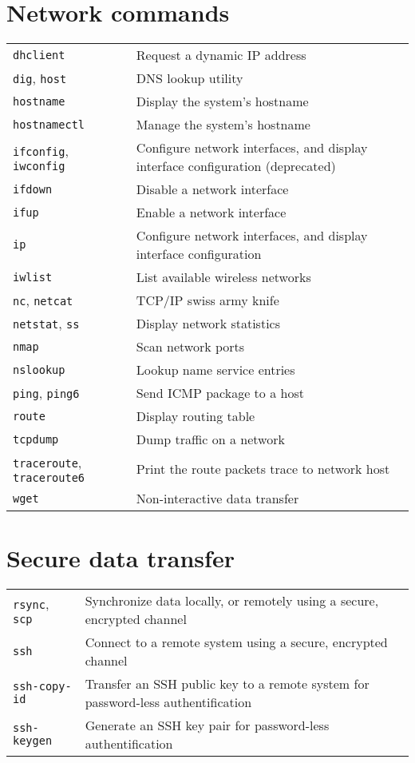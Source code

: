 \documentclass[10pt]{article}
\begin{document}
\begin{multicols}{2}

\section{Network commands}
\begin{tabular}{ p{2.5cm} p{8.5cm} }
  \hline
  \texttt{dhclient} & Request a dynamic IP address \\
  \texttt{dig}, \texttt{host} & DNS lookup utility \\
  \texttt{hostname} & Display the system's hostname \\
  \texttt{hostnamectl} & Manage the system's hostname \\
  \texttt{ifconfig}, \texttt{iwconfig} & Configure network interfaces, and display interface configuration (deprecated)\\
  \texttt{ifdown} & Disable a network interface \\
  \texttt{ifup} & Enable a network interface \\
  \texttt{ip} & Configure network interfaces, and display interface configuration \\
  \texttt{iwlist} & List available wireless networks \\
  \texttt{nc}, \texttt{netcat} & TCP/IP swiss army knife \\
  \texttt{netstat}, \texttt{ss} & Display network statistics \\
  \texttt{nmap} & Scan network ports \\
  \texttt{nslookup} & Lookup name service entries \\
  \texttt{ping}, \texttt{ping6} & Send ICMP package to a host \\
  \texttt{route} & Display routing table \\
  \texttt{tcpdump} & Dump traffic on a network \\
  \texttt{traceroute}, \texttt{traceroute6} & Print the route packets trace to network host\\
  \texttt{wget} & Non-interactive data transfer\\
  \hline
\end{tabular}

\section{Secure data transfer}
\begin{tabular}{ p{2.5cm} p{8.5cm} }
  \hline
  \texttt{rsync}, \texttt{scp} & Synchronize data locally, or remotely using a secure, encrypted channel \\
  \texttt{ssh} & Connect to a remote system using a secure, encrypted channel\\
  \texttt{ssh-copy-id} & Transfer an SSH public key to a remote system for password-less authentification\\
  \texttt{ssh-keygen} & Generate an SSH key pair for password-less authentification\\
  \hline
\end{tabular}


\end{multicols}
\end{document}
